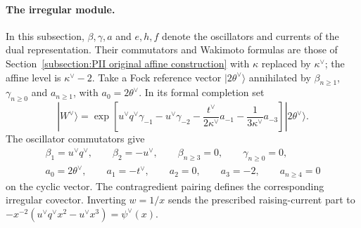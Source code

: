 \documentclass[a4paper,11pt]{article}
\numberwithin{equation}{section}
\begin{document}
\paragraph*{The irregular module.}
In this subsection, $\beta,\gamma,a$ and $e,h,f$ denote the
oscillators and currents of the dual representation.  Their
commutators and Wakimoto formulas are those of Section~\ref{subsection:PII original affine construction} with
$\kappa$ replaced by $\kappa^{\vee}$; the affine level is
$\kappa^{\vee}-2$.  Take a Fock reference vector
$|2\theta^{\vee}\rangle$ annihilated by
$\beta_{n\geq1}$, $\gamma_{n\geq0}$ and $a_{n\geq1}$, with
$a_{0}=2\theta^{\vee}$.  In its formal completion set
\begin{equation}
	|W^{\vee}\rangle
	=\exp\left[
	u^{\vee}q^{\vee}\gamma_{-1}-u^{\vee}\gamma_{-2}
	-\frac{t^{\vee}}{2\kappa^{\vee}}a_{-1}
	-\frac{1}{3\kappa^{\vee}}a_{-3}
	\right]|2\theta^{\vee}\rangle.
\end{equation}
The oscillator commutators give
\begin{equation}
	\begin{gathered}
		\beta_{1}=u^{\vee}q^{\vee},\qquad
		\beta_{2}=-u^{\vee},\qquad \beta_{n\geq3}=0,
		\qquad \gamma_{n\geq0}=0,\\
		a_{0}=2\theta^{\vee},\qquad a_{1}=-t^{\vee},\qquad
		a_{2}=0,\qquad a_{3}=-2,\qquad a_{n\geq4}=0
	\end{gathered}
\end{equation}
on the cyclic vector.  The contragredient pairing defines the
corresponding irregular covector.  Inverting $w=1/x$ sends the
prescribed raising-current part to
$-x^{-2}(u^{\vee}q^{\vee}x^{2}-u^{\vee}x^{3})=\psi^{\vee}(x)$.
\end{document}
